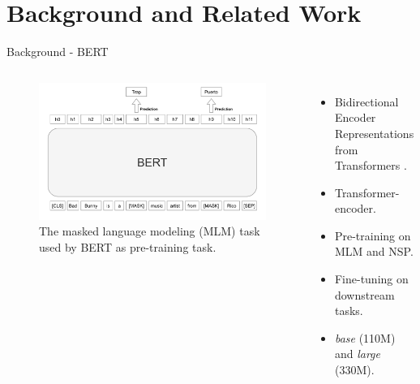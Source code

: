 \documentclass[aspectratio=169,xcolor=dvipsnames]{beamer}
\begin{document}
\section{Background and Related Work}
\begin{frame}{Background - BERT}

\begin{columns}[c] %

\begin{figure}
    \includegraphics[width=\columnwidth]{images/BERT-MLM.pdf}
    \caption{The masked language modeling (MLM) task used by BERT as pre-training task.}
    \label{fig:bert-mlm}
\end{figure}

\begin{itemize}
    \item Bidirectional Encoder Representations from Transformers \citep{devlin-etal-2019-bert}.
    \item Transformer-encoder.
    \item Pre-training on MLM and NSP.
    \item Fine-tuning on downstream tasks.
    \item \textit{base} (110M) and \textit{large} (330M).
\end{itemize}

\end{columns}
\end{frame}
\end{document}
